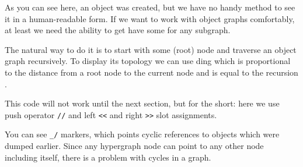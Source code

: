 \label{dump}


As you can see here, an object was created, but we have no handy method to see
it in a human-readable form. If we want to work with object graphs comfortably,
at least we need the ability to get have some  for any
subgraph.

The natural way to do it is to start with some (root) node and traverse an
object graph recursively. To display its topology we can use ding which
is proportional to the distance from a root node to the current node and is
equal to the recursion .

\clearpage
{}

This code will not work until the next section, but for the short: here we use
push operator \verb|//| and left \verb|<<|  and right \verb|>>|
 slot assignments.

\clearpage
You can see \verb|_/| markers, which points cyclic references to objects which
were dumped earlier. Since any hypergraph node can point to any other node
including itself, there is a problem with cycles in a graph.

